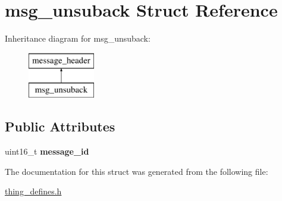 \hypertarget{structmsg__unsuback}{\section{msg\-\_\-unsuback Struct Reference}
\label{structmsg__unsuback}
}
Inheritance diagram for msg\-\_\-unsuback\-:\begin{figure}[H]
\begin{center}
\leavevmode
\includegraphics[height=2.000000cm]{structmsg__unsuback}
\end{center}
\end{figure}
\subsection*{Public Attributes}
\begin{DoxyCompactItemize}
\item 
\hypertarget{structmsg__unsuback_aa95fdd1bc9029720859a16e0c582eaf5}{uint16\-\_\-t {\bfseries message\-\_\-id}}\label{structmsg__unsuback_aa95fdd1bc9029720859a16e0c582eaf5}

\end{DoxyCompactItemize}


The documentation for this struct was generated from the following file\-:\begin{DoxyCompactItemize}
\item 
\hyperlink{thing__defines_8h}{thing\-\_\-defines.\-h}\end{DoxyCompactItemize}
